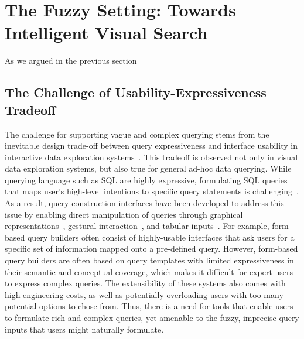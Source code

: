 \section{The Fuzzy Setting: Towards Intelligent Visual Search}\label{sec:vague}


As we argued in the previous section 
\subsection{The Challenge of Usability-Expressiveness Tradeoff}
\par The challenge for supporting vague and 
complex querying stems from the inevitable design trade-off between query expressiveness and interface usability in interactive data exploration systems~\cite{Jagadish2007,Morton2014}. This tradeoff is observed not only in visual data exploration systems, but also true for general ad-hoc data querying. While querying language such as SQL are highly expressive, formulating SQL queries that maps user's high-level intentions to specific query statements is challenging~\cite{Jagadish2007,Khoussainova2010}. As a result, query construction interfaces have been developed to address this issue by enabling direct manipulation of queries through graphical representations~\cite{Abouzied2012}, gestural interaction~\cite{Nandi2013}, and tabular inputs~\cite{Zloof1975,Embley1989}. For example, form-based query builders often consist of highly-usable interfaces that ask users for a specific set of information mapped onto a pre-defined query. However, form-based query builders are often based on query templates with limited expressiveness in their semantic and conceptual coverage, which makes it difficult for expert users to express complex queries. The extensibility of these systems also comes with high engineering costs, as well as potentially overloading users with too many potential options to chose from. Thus, there is a need for tools that enable users to formulate rich and complex queries, yet amenable to the fuzzy, imprecise query inputs that users might naturally formulate. 

